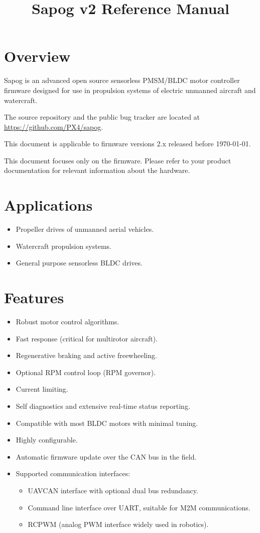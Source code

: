 \documentclass{zubaxdoc}
\title{Sapog v2 Reference Manual}
\begin{document}
\frontmatter

\begin{titlepage}
\section*{Overview}

Sapog is an advanced open source sensorless PMSM/\allowbreak{}BLDC motor controller firmware designed for
use in propulsion systems of electric unmanned aircraft and watercraft.

The source repository and the public bug tracker are located at
\url{https://github.com/PX4/sapog}.

This document is applicable to firmware versions 2.x released before \today.

This document focuses only on the firmware.
Please refer to your product documentation for relevant information about the hardware.

\section*{Applications}
\begin{itemize}
    \item Propeller drives of unmanned aerial vehicles.
    \item Watercraft propulsion systems.
    \item General purpose sensorless BLDC drives.
\end{itemize}

\BeginRightColumn
\section*{Features}
\begin{itemize}
    \item Robust motor control algorithms.
    \item Fast response (critical for multirotor aircraft).
    \item Regenerative braking and active freewheeling.
    \item Optional RPM control loop (RPM governor).
    \item Current limiting.
    \item Self diagnostics and extensive real-time status reporting.
    \item Compatible with most BLDC motors with minimal tuning.
    \item Highly configurable.
    \item Automatic firmware update over the CAN bus in the field.
    \item Supported communication interfaces:
    \begin{itemize}
        \item UAVCAN interface with optional dual bus redundancy.
        \item Command line interface over UART, suitable for M2M communications.
        \item RCPWM (analog PWM interface widely used in robotics).
    \end{itemize}
\end{itemize}

\end{titlepage}
\end{document}

